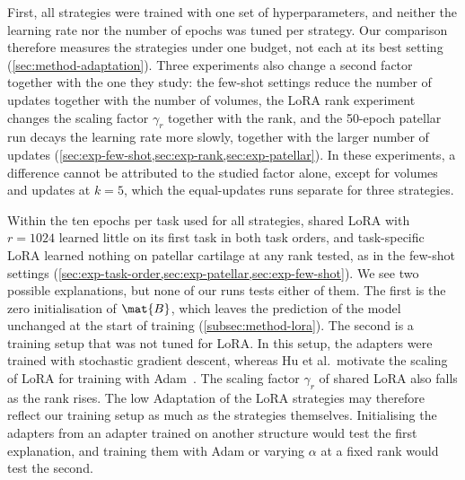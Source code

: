 First, all strategies were trained with one set of hyperparameters, and neither the learning rate nor the number of epochs was tuned per strategy.
Our comparison therefore measures the strategies under one budget, not each at its best setting (\cref{sec:method-adaptation}).
Three experiments also change a second factor together with the one they study: the few-shot settings reduce the number of updates together with the number of volumes, the LoRA rank experiment changes the scaling factor $\gamma_r$ together with the rank, and the 50-epoch patellar run decays the learning rate more slowly, together with the larger number of updates (\cref{sec:exp-few-shot,sec:exp-rank,sec:exp-patellar}).
In these experiments, a difference cannot be attributed to the studied factor alone, except for volumes and updates at $k = 5$, which the equal-updates runs separate for three strategies.

Within the ten epochs per task used for all strategies, shared LoRA with $r = 1024$ learned little on its first task in both task orders, and task-specific LoRA learned nothing on patellar cartilage at any rank tested, as in the few-shot settings (\cref{sec:exp-task-order,sec:exp-patellar,sec:exp-few-shot}).
We see two possible explanations, but none of our runs tests either of them.
The first is the zero initialisation of $\mat{B}$, which leaves the prediction of the model unchanged at the start of training (\cref{subsec:method-lora}).
The second is a training setup that was not tuned for LoRA.
In this setup, the adapters were trained with stochastic gradient descent, whereas Hu et al.\ motivate the scaling of LoRA for training with Adam~\cite[Sec.~4.1]{hu2022lora}.
The scaling factor $\gamma_r$ of shared LoRA also falls as the rank rises.
The low Adaptation of the LoRA strategies may therefore reflect our training setup as much as the strategies themselves.
Initialising the adapters from an adapter trained on another structure would test the first explanation, and training them with Adam or varying $\alpha$ at a fixed rank would test the second.

